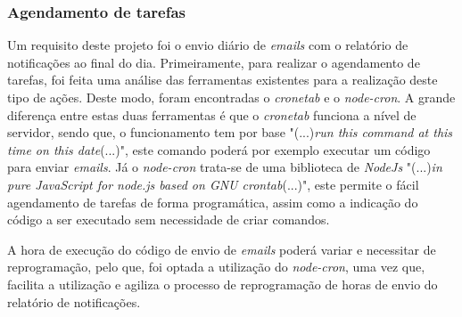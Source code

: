 \subsubsection{Agendamento de tarefas}

Um requisito deste projeto foi o envio diário de \textit{emails} com o relatório de notificações ao final do dia. Primeiramente, para realizar o agendamento de tarefas, foi feita uma análise das ferramentas existentes para a realização deste tipo de ações. Deste modo, foram encontradas o \textit{cronetab} e o \textit{node-cron}. A grande diferença entre estas duas ferramentas é que o \textit{cronetab} funciona a nível de servidor, sendo que, o funcionamento tem por base "(...)\emph{run this command at this time
on this date}(...)"\citep{crontab}, este comando poderá por exemplo executar um código para enviar \textit{emails}. Já o \textit{node-cron} trata-se de uma biblioteca de \textit{NodeJs} "(...)\emph{in pure JavaScript for node.js based on GNU crontab}(...)"\citep{node_cron}, este permite o fácil agendamento de tarefas de forma programática, assim como a indicação do código a ser executado sem necessidade de criar comandos.

A hora de execução do código de envio de \textit{emails} poderá variar e necessitar de reprogramação, pelo que, foi optada a utilização do \textit{node-cron}, uma vez que, facilita a utilização e agiliza o processo de reprogramação de horas de envio do relatório de notificações.
